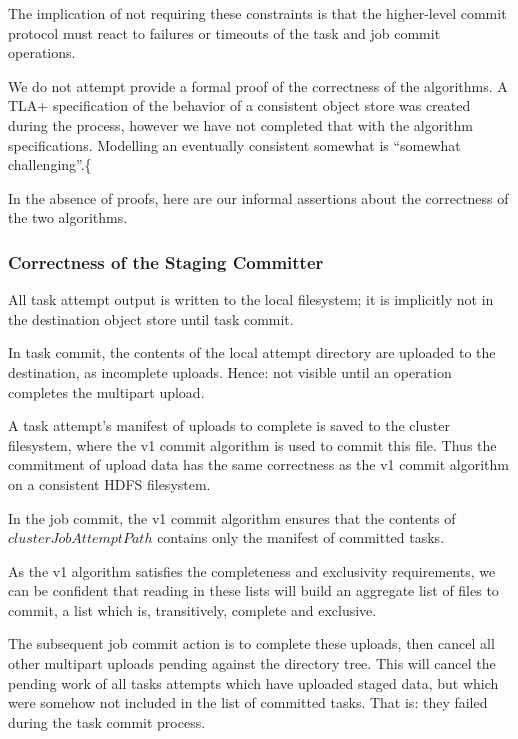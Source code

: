 \documentclass[format=acmsmall, screen=true, review=false]{acmart}
\begin{document}
The implication of not requiring these constraints is that the higher-level
commit protocol must react to failures or timeouts of the task and job
commit operations.



We do not attempt provide a formal proof of the correctness of the algorithms.
A TLA+ specification of the behavior of a consistent object store was created
during the process, however we have not completed that with the algorithm specifications.
Modelling an eventually consistent somewhat is ``somewhat challenging''.\{

In the absence of proofs,
here are our informal assertions about the correctness of the two algorithms.

\subsubsection{Correctness of the Staging Committer}

All task attempt output is written to the local filesystem;
it is implicitly not in the destination object store until task commit.

In task commit, the contents of the local attempt directory are uploaded to the
destination, as incomplete uploads.
Hence: not visible until an operation completes the multipart upload.

A task attempt's manifest of uploads to complete is saved to the cluster filesystem,
where the v1 commit algorithm is used to commit this file.
Thus the commitment of upload data has the same correctness as the
v1 commit algorithm on a consistent HDFS filesystem.

In the job commit, the v1 commit algorithm ensures that the contents
of $clusterJobAttemptPath$ contains only the manifest of committed tasks.

As the v1 algorithm satisfies the completeness and exclusivity requirements,
we can be confident that reading in these lists will build an aggregate list
of files to commit, a list which is, transitively, complete and exclusive.

The subsequent job commit action is to complete these uploads,
then cancel all other multipart uploads pending against the directory tree.
This will cancel the pending work of all tasks attempts which have uploaded staged
data, but which were somehow not included in the list of committed tasks.
That is: they failed during the task commit process.
\end{document}
